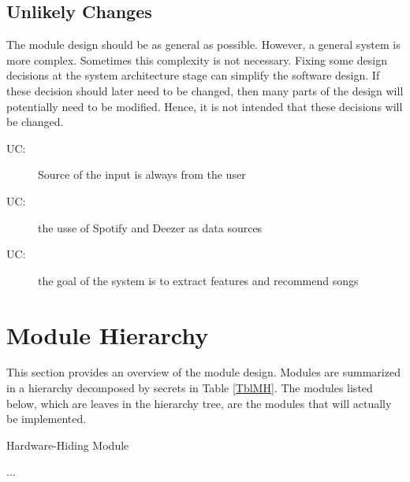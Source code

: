 \documentclass[12pt, titlepage]{article}
\newcounter{ucnum}
\newcommand{\uctheucnum}{UC\theucnum}
\newcounter{mnum}
\newcommand{\mthemnum}{M\themnum}
\begin{document}

\subsection{Unlikely Changes} \label{SecUchange}

The module design should be as general as possible. However, a general system is
more complex. Sometimes this complexity is not necessary. Fixing some design
decisions at the system architecture stage can simplify the software design. If
these decision should later need to be changed, then many parts of the design
will potentially need to be modified. Hence, it is not intended that these
decisions will be changed.

\begin{description}
\item[ \uctheucnum \label{ucIO}:] Source of the input is always from the user
\item[ \uctheucnum \label{ucIO}:] the usse of Spotify and Deezer as data sources
\item[ \uctheucnum \label{ucIO}:] the goal of the system is to extract features and recommend songs
\end{description}

\section{Module Hierarchy} \label{SecMH}

This section provides an overview of the module design. Modules are summarized
in a hierarchy decomposed by secrets in Table \ref{TblMH}. The modules listed
below, which are leaves in the hierarchy tree, are the modules that will
actually be implemented.

\begin{description}
\item [ \mthemnum \label{mHH}:] Hardware-Hiding Module
\item ...
\end{description}
\end{document}
